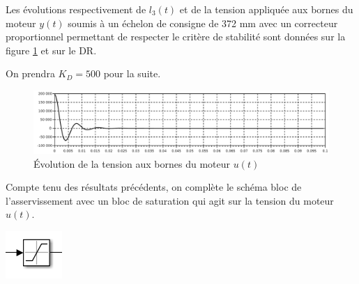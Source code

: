 Les évolutions respectivement de $l_3(t)$ et de la tension appliquée aux bornes du moteur $y(t)$ soumis à un échelon de consigne de 372 mm avec un correcteur proportionnel permettant de respecter le critère de stabilité sont données sur la figure \ref{fig21} et sur le DR.

On prendra $K_D= 500$ pour la suite.
\begin{figure}[ht!]
\begin{center}
 \includegraphics[width=0.9\linewidth]{img/fig21}
\end{center}
\caption{\label{fig21} Évolution de la tension aux bornes du moteur $u(t)$}
\end{figure}


\begin{minipage}{0.8\linewidth}
Compte tenu des résultats précédents, on complète le schéma bloc de l'asservissement avec un bloc de saturation qui agit sur la tension du moteur $u(t)$.
\end{minipage}\hfill
\begin{minipage}{0.15\linewidth}
\begin{center}
 \includegraphics[width=0.9\linewidth]{img/fig22}
\end{center}
\end{minipage}

